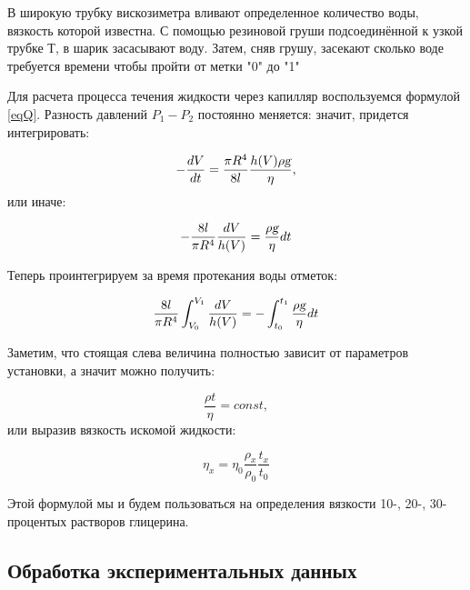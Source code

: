 \documentclass[a4paper]{article}
\begin{document}
В широкую трубку вискозиметра вливают определенное количество воды, вязкость
которой известна. С помощью резиновой груши подсоединённой к узкой трубке Т,
в шарик засасывают воду. Затем, сняв грушу, засекают сколько воде требуется 
времени чтобы пройти от метки "0" до "1"

Для расчета процесса течения жидкости через капилляр воспользуемся формулой \eqref{eqQ}.
Разность давлений $P_1 - P_2$ постоянно меняется: значит, придется интегрировать:

\begin{equation}
    - \frac{dV}{dt} = \frac{\pi R^4}{8l} \frac{h(V) \rho \textsl{g}}{\eta},
\end{equation}
или иначе:

\begin{equation}
    -\frac{8l}{\pi R^4} \frac{dV}{h(V)} = \frac{\rho \textsl{g}}{\eta} dt
\end{equation}

Теперь проинтегрируем за время протекания воды отметок:

\begin{equation}
    \frac{8l}{\pi R^4} \int^{V_1}_{V_0} \frac{dV}{h(V)} =
                     - \int^{t_1}_{t_0} \frac{\rho \textsl{g}}{\eta} dt
\end{equation}

Заметим, что стоящая слева величина полностью зависит от параметров установки,
а значит можно получить:

\begin{equation}
    \frac{\rho t}{\eta} = const,
\end{equation}
или выразив вязкость искомой жидкости:

\begin{equation}
    \eta_x = \eta_0 \frac{\rho_x}{\rho_0} \frac{t_x}{t_0}
\end{equation}

Этой формулой мы и будем пользоваться на определения вязкости
10-, 20-, 30-процентых растворов глицерина.

\subsection{Обработка экспериментальных данных}
\end{document}
